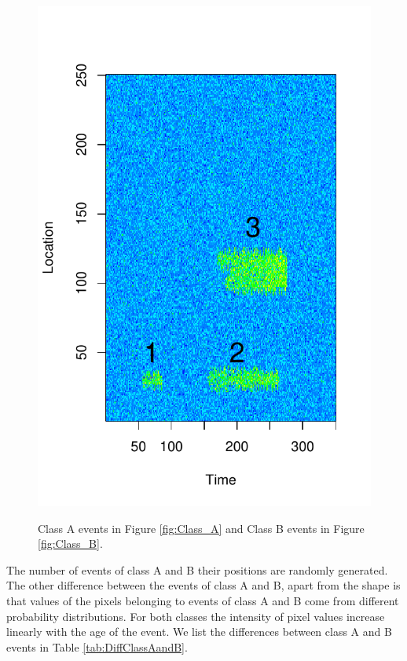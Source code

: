 \documentclass[a4paper,11pt]{article}
\begin{document}
\begin{figure}[H]
{		\includegraphics[clip=true, scale=0.48]{./Graphics/3_B_Blobs_labels.pdf}
		\label{fig:Class_B}
	}
	\caption{\footnotesize Class A events in Figure \ref{fig:Class_A} and Class B events in Figure \ref{fig:Class_B}. }
	\label{fig:Classes_A_And_B}
\end{figure}

The number of events of class A and B their positions are randomly generated. The other difference between the events of class A and B, apart from the shape is that values of the pixels belonging to events of class A and B come from different probability distributions. For both classes the intensity of pixel values increase linearly with the age of the event. We list the differences between class A and B events in Table \ref{tab:DiffClassAandB}.
\end{document}
